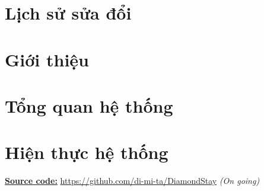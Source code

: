 \documentclass[a4paper]{article}
\begin{document}
\newpage
\thispagestyle{empty}
\tableofcontents

\newpage
\thispagestyle{empty}
\listoffigures
\newpage 

\section{Lịch sử sửa đổi}


\newpage 

\section{Giới thiệu}


\section{Tổng quan hệ thống}


\newpage 

















\newpage 
\section{Hiện thực hệ thống}
\underline{\textbf{Source code:}} \url{https://github.com/di-mi-ta/DiamondStay} \textit{(On going)}
\end{document}
